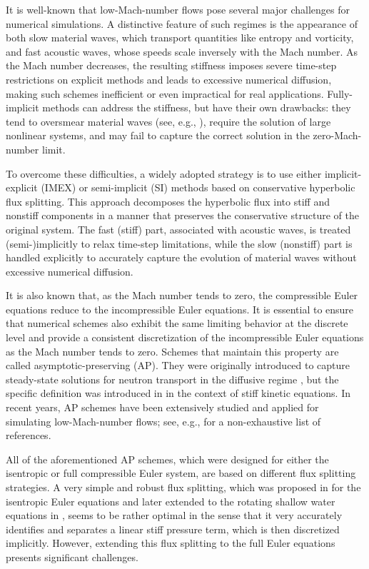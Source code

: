 \documentclass[preprint,12pt]{elsarticle}
\begin{document}
It is well-known that low-Mach-number flows pose several major challenges for numerical simulations. A distinctive feature of such regimes
is the appearance of both slow material waves, which transport quantities like entropy and vorticity, and fast acoustic waves, whose speeds
scale inversely with the Mach number. As the Mach number decreases, the resulting stiffness imposes severe time-step restrictions on
explicit methods and leads to excessive numerical diffusion, making such schemes inefficient or even impractical for real applications.
Fully-implicit methods can address the stiffness, but have their own drawbacks: they tend to oversmear material waves (see, e.g.,
\cite{boscarino2018all}), require the solution of large nonlinear systems, and may fail to capture the correct solution in the
zero-Mach-number limit.

To overcome these difficulties, a widely adopted strategy is to use either implicit-explicit (IMEX) or semi-implicit (SI) methods based on
conservative hyperbolic flux splitting. This approach decomposes the hyperbolic flux into stiff and nonstiff components in a manner that
preserves the conservative structure of the original system. The fast (stiff) part, associated with acoustic waves, is treated
(semi-)implicitly to relax time-step limitations, while the slow (nonstiff) part is handled explicitly to accurately capture the evolution
of material waves without excessive numerical diffusion.

It is also known that, as the Mach number tends to zero, the compressible Euler equations reduce to the incompressible Euler equations. It
is essential to ensure that numerical schemes also exhibit the same limiting behavior at the discrete level and provide a consistent
discretization of the incompressible Euler equations as the Mach number tends to zero. Schemes that maintain this property are called
asymptotic-preserving (AP). They were originally introduced to capture steady-state solutions for neutron transport in the diffusive regime
\cite{LMM,LarMor}, but the specific definition was introduced in \cite{GJL,jin1999efficient,Kla99} in the context of stiff kinetic
equations. In recent years, AP schemes have been extensively studied and applied for simulating low-Mach-number flows; see, e.g.,
\cite{AllVig,boscarino2019high,boscarino2018all,BDLTV,CGK,cordier2012asymptotic,DJL,degond2011all,DLMV,dimarco2017study,haack2012all,Kle95,noelle2014weakly,Tang12,TorVaz,zeifang2020novel}
for a non-exhaustive list of references.

All of the aforementioned AP schemes, which were designed for either the isentropic or full compressible Euler system, are based on 
different flux splitting strategies.  A very simple and robust flux splitting, which was proposed in \cite{haack2012all} for the isentropic 
Euler equations and later extended to the rotating shallow water equations in \cite{LCK}, seems to be rather optimal in the sense that
it very accurately identifies and separates a linear stiff pressure term, which is then discretized implicitly. However, extending this flux
splitting to the full Euler equations presents significant challenges. 
\end{document}
